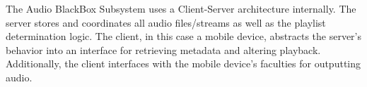 The Audio BlackBox Subsystem uses a Client-Server architecture internally. The server stores and coordinates all audio files/streams as well as the playlist determination logic. The client, in this case a mobile device, abstracts the server's behavior into an interface for retrieving metadata and altering playback. Additionally, the client interfaces with the mobile device's faculties for outputting audio.